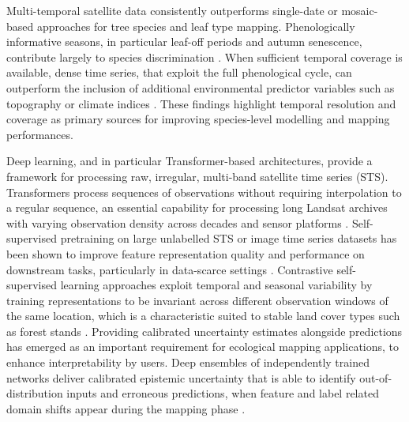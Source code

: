 \documentclass[essd, manuscript]{copernicus}
\begin{document}
Multi-temporal satellite data consistently outperforms single-date or mosaic-based approaches for tree species and leaf type mapping. Phenologically informative seasons, in particular leaf-off periods and autumn senescence, contribute largely to species discrimination \citep{kollert_exploring_2021,tan_leveraging_2025}. When sufficient temporal coverage is available, dense time series, that exploit the full phenological cycle, can outperform the inclusion of additional environmental predictor variables such as topography or climate indices \citep{hemmerling_mapping_2021}. These findings highlight temporal resolution and coverage as primary sources for improving species-level modelling and mapping performances.

Deep learning, and in particular Transformer-based architectures, provide a framework for processing raw, irregular, multi-band satellite time series (STS). Transformers process sequences of observations without requiring interpolation to a regular sequence, an essential capability for processing long Landsat archives with varying observation density across decades and sensor platforms \citep{zerveas_transformer-based_2020, yuan_sits-former_2022}. Self-supervised pretraining on large unlabelled STS or image time series datasets has been shown to improve feature representation quality and performance on downstream tasks, particularly in data-scarce settings \citep{yuan_yuan_self-supervised_2020, hiebl_advancing_2025,feng_tessera_2026}. Contrastive self-supervised learning approaches exploit temporal and seasonal variability by training representations to be invariant across different observation windows of the same location, which is a characteristic suited to stable land cover types such as forest stands \citep{chen_simple_2020,manas_seasonal_2021}. Providing calibrated uncertainty estimates alongside predictions has emerged as an important requirement for ecological mapping applications, to enhance interpretability by users. Deep ensembles of independently trained networks deliver calibrated epistemic uncertainty that is able to identify out-of-distribution inputs and erroneous predictions, when feature and label related domain shifts appear during the mapping phase \citep{sylvain_high-resolution_2024, hiebl_advancing_2025}.
\end{document}

